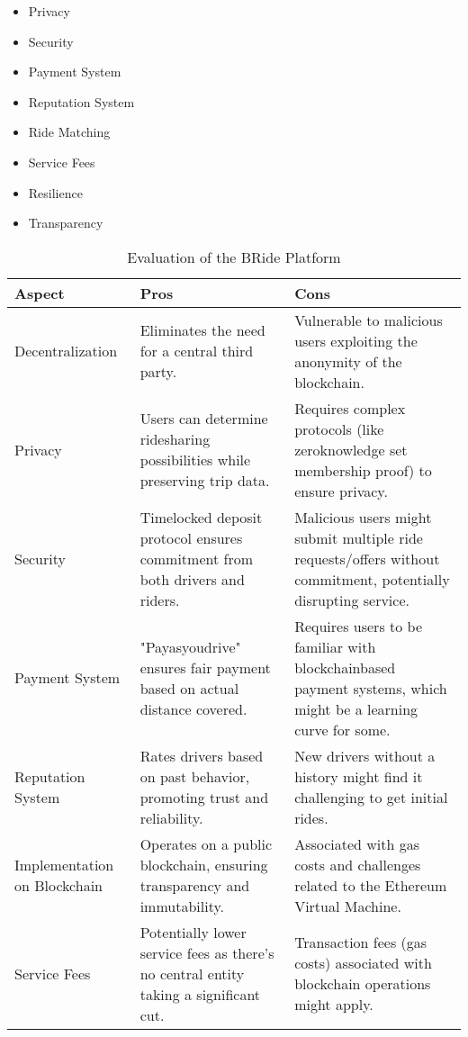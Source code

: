 \begin{table}[h]
\centering
\caption{Evaluation of the BRide Platform}

\begin{itemize}
    \item Privacy
    \item Security
    \item Payment System
    \item Reputation System
    \item Ride Matching
    \item Service Fees
    \item Resilience
    \item Transparency
\end{itemize}



\begin{tabular}{p{3cm}p{5cm}p{5cm}}
\toprule
\textbf{Aspect} & \textbf{Pros} & \textbf{Cons} \\
\midrule
Decentralization &  Eliminates the need for a central third party. &  Vulnerable to malicious users exploiting the anonymity of the blockchain. \\
\midrule
Privacy &  Users can determine ridesharing possibilities while preserving trip data. &  Requires complex protocols (like zeroknowledge set membership proof) to ensure privacy. \\
\midrule
Security &  Timelocked deposit protocol ensures commitment from both drivers and riders. &  Malicious users might submit multiple ride requests/offers without commitment, potentially disrupting service. \\
\midrule
Payment System &  "Payasyoudrive" ensures fair payment based on actual distance covered. &  Requires users to be familiar with blockchainbased payment systems, which might be a learning curve for some. \\
\midrule
Reputation System &  Rates drivers based on past behavior, promoting trust and reliability. &  New drivers without a history might find it challenging to get initial rides. \\
\midrule
Implementation on Blockchain &  Operates on a public blockchain, ensuring transparency and immutability. &  Associated with gas costs and challenges related to the Ethereum Virtual Machine. \\
\midrule
Service Fees &  Potentially lower service fees as there's no central entity taking a significant cut. &  Transaction fees (gas costs) associated with blockchain operations might apply. \\

\end{tabular}
\end{table}
